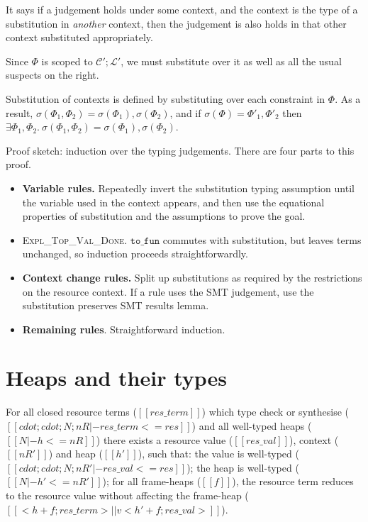 It says if a judgement holds under some context, and the context is the type of
a substitution in \emph{another} context, then the judgement is also holds in
that other context substituted appropriately.

Since $\Phi$ is scoped to $\mathcal{C}' ;
\mathcal{L}'$, we must substitute over it as well as all the usual suspects on
the right.

Substitution of contexts is defined by substituting over each constraint in
$\Phi$. As a result, $\sigma (\Phi_1, \Phi_2) = \sigma (\Phi_1) , \sigma (\Phi_2) $,
and if $\sigma (\Phi) =  \Phi'_1 , \Phi'_2$ then $\exists \Phi_1,  \Phi_2 . \:
\sigma (\Phi_1, \Phi_2)   = \sigma (\Phi_1), \sigma (\Phi_2)$.

Proof sketch: induction over the typing judgements. There are four parts to
this proof.
\begin{itemize}
\item \textbf{Variable rules.} Repeatedly invert the substitution typing
    assumption until the variable used in the context appears, and then
    use the equational properties of substitution and the assumptions
    to prove the goal.
\item \textsc{Expl\_Top\_Val\_Done}. $\mathtt{to\_fun}$ commutes with
    substitution, but leaves terms unchanged, so induction proceeds
    straightforwardly.
\item \textbf{Context change rules.} Split up substitutions as required by the
    restrictions on the resource context. If a rule uses the SMT judgement, use
    the substitution preserves SMT results lemma.
\item \textbf{Remaining rules}. Straightforward induction.
\end{itemize}

\section{Heaps and their types}\label{sec:heap-types}

\begin{theorem}
For all closed resource terms ($[[ res\_term ]]$) which type check or
synthesise ($[[ cdot ; cdot ; N ; nR |- res\_term <= res ]]$) and all well-typed
heaps ($[[ N |- h <= nR ]]$) there exists a resource value ($[[ res\_val ]]$),
context ($[[ nR' ]]$) and heap ($[[ h' ]]$), such that: the value is
well-typed ($[[ cdot ; cdot ; N ; nR' |- res\_val <= res ]]$); the heap is
well-typed ($[[ N |- h' <= nR' ]]$); for all frame-heaps ($[[ f ]]$), the
resource term reduces to the resource value without affecting the frame-heap
($[[ < h + f ; res\_term > ||v < h' + f ; res\_val > ]]$).
\end{theorem}

